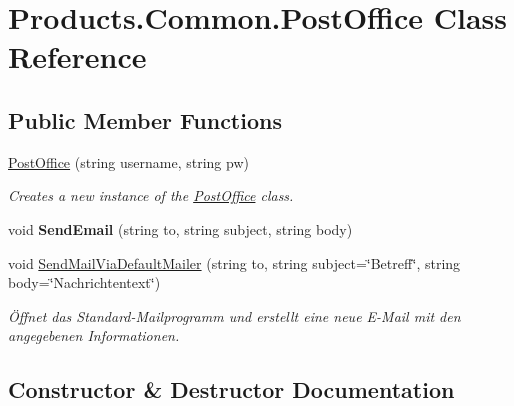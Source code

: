\hypertarget{class_products_1_1_common_1_1_post_office}{}\section{Products.\+Common.\+Post\+Office Class Reference}
\label{class_products_1_1_common_1_1_post_office}
\subsection*{Public Member Functions}
\begin{DoxyCompactItemize}
\item 
\hyperlink{class_products_1_1_common_1_1_post_office_ad6429fbcb9446a160df23db9324bdad2}{Post\+Office} (string username, string pw)
\begin{DoxyCompactList}\small\item\em Creates a new instance of the \hyperlink{class_products_1_1_common_1_1_post_office}{Post\+Office} class. \end{DoxyCompactList}\item 
void {\bfseries Send\+Email} (string to, string subject, string body)\hypertarget{class_products_1_1_common_1_1_post_office_af271b7cea6e142bb44bfe873385ed3f0}{}\label{class_products_1_1_common_1_1_post_office_af271b7cea6e142bb44bfe873385ed3f0}

\item 
void \hyperlink{class_products_1_1_common_1_1_post_office_a78e1a09e0554844327d4063fd5d28e9d}{Send\+Mail\+Via\+Default\+Mailer} (string to, string subject=\char`\"{}Betreff\char`\"{}, string body=\char`\"{}Nachrichtentext\char`\"{})
\begin{DoxyCompactList}\small\item\em Öffnet das Standard-\/\+Mailprogramm und erstellt eine neue E-\/\+Mail mit den angegebenen Informationen. \end{DoxyCompactList}\end{DoxyCompactItemize}


\subsection{Constructor \& Destructor Documentation}
